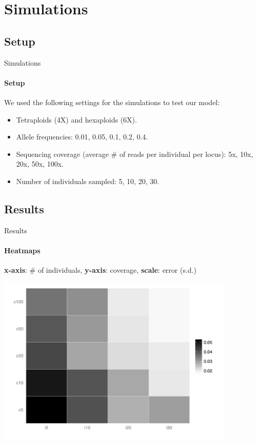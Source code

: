 \documentclass[presentation]{beamer}
\begin{document}
\section{Simulations}

\subsection{Setup}

\begin{frame}[t]{Simulations}
	\framesubtitle{Setup}
	
	We used the following settings for the simulations to test our model:
	\vspace{0.1in}
	
	\begin{itemize}
		\item Tetraploids (4X) and hexaploids (6X).
		\item Allele frequencies: 0.01, 0.05, 0.1, 0.2, 0.4.
		\item Sequencing coverage (average \# of reads per individual per locus): 5x, 10x, 20x, 50x, 100x.
		\item Number of individuals sampled: 5, 10, 20, 30.
	\end{itemize}
\end{frame}

\subsection{Results}

\begin{frame}[c]{Results}
	\framesubtitle{Heatmaps}
	\textbf{x-axis}: \# of individuals, \textbf{y-axis}: coverage, \textbf{scale}: error (s.d.)
	\pause
	\begin{center}
		\includegraphics[width=0.85\textwidth]{fig/hex-plot0-05}
	\end{center}
\end{frame}
\end{document}
